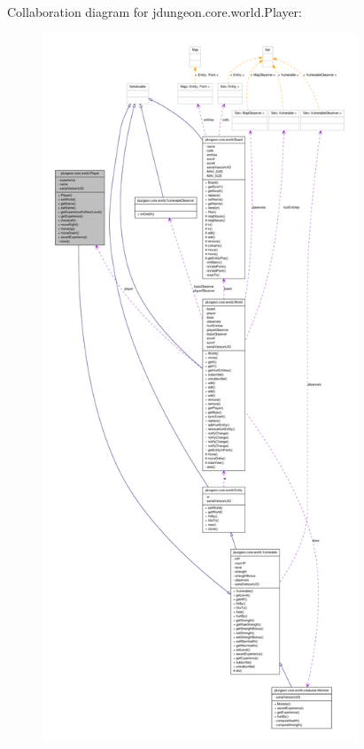 Collaboration diagram for jdungeon.core.world.Player:
\nopagebreak
\begin{figure}[H]
\begin{center}
\leavevmode
\includegraphics[height=600pt]{classjdungeon_1_1core_1_1world_1_1_player__coll__graph}
\end{center}
\end{figure}
